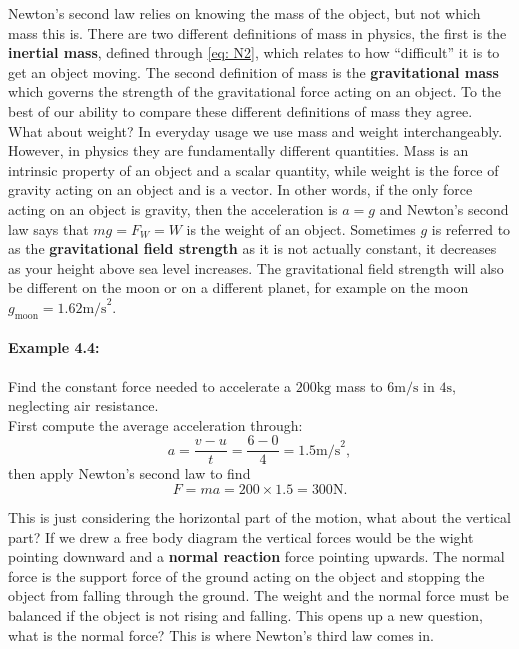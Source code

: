 \documentclass[a4paper,12pt]{book}
\begin{document}
Newton's second law relies on knowing the mass of the object, but not which mass this is. There are two different definitions of mass in physics, the first is the \textbf{inertial mass}, defined through \cref{eq: N2}, which relates to how ``difficult'' it is to get an object moving. The second definition of mass is the \textbf{gravitational mass} which governs the strength of the gravitational force acting on an object. To the best of our ability to compare these different definitions of mass they agree.\\

What about weight? In everyday usage we use mass and weight interchangeably. However, in physics they are fundamentally different quantities. Mass is an intrinsic property of an object and a scalar quantity, while weight is the force of gravity acting on an object and is a vector. In other words, if the only force acting on an object is gravity, then the acceleration is $a=g$ and Newton's second law says that $mg=F_{W}=W$ is the weight of an object. Sometimes $g$ is referred to as the \textbf{gravitational field strength} as it is not actually constant, it decreases as your height above sea level increases.  The gravitational field strength will also be different on the moon or on a different planet, for example on the moon $g_{\text{moon}}=1.62\text{m/s}^{2}$.

\paragraph{Example 4.4:} Find the constant force needed to accelerate a $200\text{kg}$ mass to $6\text{m/s}$ in $4\text{s}$, neglecting air resistance.\\

First compute the average acceleration through:
\begin{equation*}
a=\frac{v-u}{t}=\frac{6-0}{4}=1.5\text{m/s}^{2},
\end{equation*}
then apply Newton's second law to find
\begin{equation*}
F=ma=200\times 1.5 =300\text{N}.
\end{equation*}

This is just considering the horizontal part of the motion, what about the vertical part? If we drew a free body diagram the vertical forces would be the wight pointing downward and a \textbf{normal reaction} force pointing upwards. The normal force is the support force of the ground acting on the object and stopping the object from falling through the ground. The weight and the normal force must be balanced if the object is not rising and falling. This opens up a new question, what is the normal force? This is where Newton's third law comes in.
\end{document}
